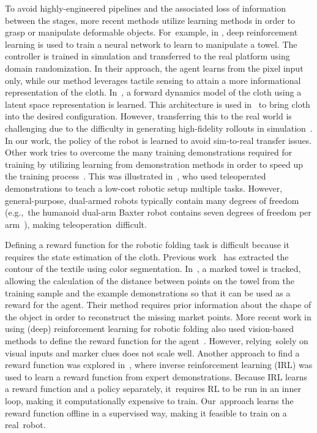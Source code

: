 \documentclass[applsci,article,accept,moreauthors,pdftex]{Definitions/mdpi}
\begin{document}
To avoid highly-engineered pipelines and the associated loss of information between the stages, more recent methods utilize learning methods in order to grasp or manipulate deformable objects. For~example, in \cite{Matas2018}, deep reinforcement learning is used to train a neural network to learn to manipulate a towel. The controller is trained in simulation and transferred to the real platform using domain randomization. In their approach, the agent learns from the pixel input only, while our method leverages tactile sensing to attain a more informational representation of the cloth. In~\cite{Arnold2019}, a forward dynamics model of the cloth using a latent space representation is learned. This architecture is used in~\cite{Tanaka2018} to bring cloth into the desired configuration. However, transferring this to the real world is challenging due to the difficulty in generating high-fidelity rollouts in simulation~\cite{Matas2018, Tanaka2018}. In our work, the policy of the robot is learned to avoid sim-to-real transfer issues. Other work tries to overcome the many training demonstrations required for training by utilizing learning from demonstration methods in order to speed up the training process~\cite{Balaguer2011, Laskey2017}. This was illustrated in~\cite{Rahmatizadeh2018}, who used teleoperated demonstrations to teach a low-cost robotic setup multiple tasks. However, general-purpose, dual-armed robots typically contain many degrees of freedom (e.g.,~the humanoid dual-arm Baxter\textsuperscript{\textregistered} robot contains seven degrees of freedom per arm~\cite{Baxter}), making teleoperation~difficult.\par

Defining a reward function for the robotic folding task is difficult because it requires the state estimation of the cloth. Previous work~\cite{Doumanoglou2016,Miller2012} has extracted the contour of the textile using color segmentation. In~\cite{Balaguer2011}, a marked towel is tracked, allowing the calculation of the distance between points on the towel from the training sample and the example demonstrations so that it can be used as a reward for the agent. Their method requires prior information about the shape of the object in order to reconstruct the missing market points. More recent work in using (deep) reinforcement learning for robotic folding also used vision-based methods to define the reward function for the agent~\cite{Tsurumine2019, Matas2018}. However, relying~solely on visual inputs and marker clues does not scale well. Another approach to find a reward function was explored in~\cite{Abbeel2004, Finn2016}, where inverse reinforcement learning (IRL) was used to learn a reward function from expert demonstrations. Because IRL learns a reward function and a policy separately, it~requires RL to be run in an inner loop, making it computationally expensive to train. Our~approach learns the reward function offline in a supervised way, making it feasible to train on a real~robot.
\end{document}
